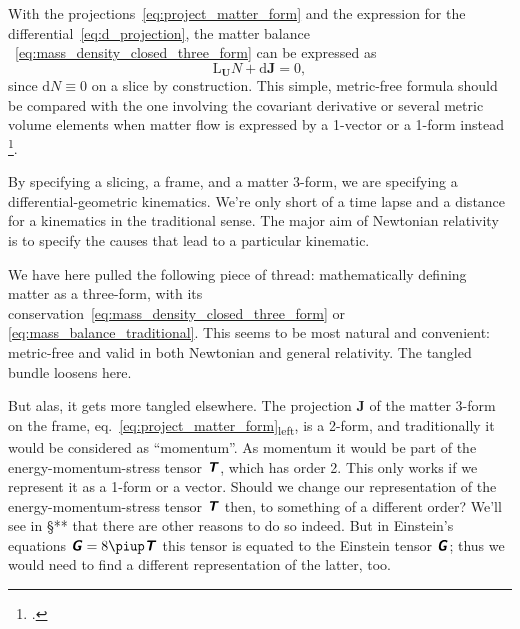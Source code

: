 \documentclass[\ifafour a4paper,12pt,\else a5paper,10pt,\fi%
onecolumn,oneside,article,%
british%
]{memoir}
\theoremstyle{remark}
\theoremstyle{innote}
\newcommand*{\mathte}[1]{\textbf{\textit{\textsf{#1}}}}
\newcommand*{\citep}{\footcites}
\newcommand*{\pu}{\piup}%
\newcommand*{\di}{\mathrm{d}}%
\renewcommand*{\|}[1][]{\nonscript\,#1\vert\nonscript\;\mathopen{}}
\newcommand*{\sect}{\S}%
\newcommand*{\eqn}{eq.}%
\newcommand*{\eg}{{e.g.}}
\newcommand*{\Li}{\mathrm{L}}
\newcommand*{\yd}{N}
\newcommand*{\yjj}{J}
\newcommand*{\yj}{\bm{\yjj}}
\newcommand*{\yGG}{G}
\newcommand*{\yG}{\mathte{\yGG}}
\newcommand*{\yTTf}{T}
\newcommand*{\yTf}{\mathte{\yTTf}}
\newcommand*{\yFF}{U}
\newcommand*{\yF}{\bm{\yFF}}
\begin{document}
With the projections~\eqref{eq:project_matter_form} and the expression for
the differential~\eqref{eq:d_projection}, the 
matter balance ~\eqref{eq:mass_density_closed_three_form} can be expressed as
\begin{equation}
  \label{eq:mass_balance_traditional}
  \Li_{\yF}\yd + \di\yj = 0,
\end{equation}
since $\di\yd\equiv 0$ on a slice by construction. This simple, metric-free
formula should be compared with the one involving the covariant derivative
or several metric volume elements when matter flow is expressed by a
1-vector or a 1-form instead \citep[\eg][\eqn~(7.205), \sect~7.3,
p.~361]{rezzollaetal2013}[\eqn~(6.47), \sect~6.3.2,
p.~110]{gourgoulhon2007_r2012}.

By specifying a slicing, a frame, and a matter 3-form, we are specifying a
differential-geometric kinematics. We're only short of a time lapse and a
distance for a kinematics in the traditional sense. The major aim of
Newtonian relativity is to specify the causes that lead to a particular
kinematic.

\medskip

We have here pulled the following piece of thread: mathematically defining
matter as a three-form, with its
conservation~\eqref{eq:mass_density_closed_three_form} or
\eqref{eq:mass_balance_traditional}. This seems to be most natural and
convenient: metric-free and valid in both Newtonian and general relativity.
The tangled bundle loosens here.

But alas, it gets more tangled elsewhere. The projection $\yj$ of the
matter 3-form on the frame,
\eqn~\eqref{eq:project_matter_form}\textsubscript{left}, is a 2-form, and
traditionally it would be considered as \enquote{momentum}. As momentum it
would be part of the energy-momentum-stress tensor $\yTf$, which has order
2. This only works if we represent it as a 1-form or a vector. Should we
change our representation of the energy-momentum-stress tensor $\yTf$ then,
to something of a different order? We'll see in \sect*** that there are
other reasons to do so indeed. But in Einstein's equations $\yG = 8\pu\yTf$
this tensor is equated to the Einstein tensor $\yG$; thus we would need to
find a different representation of the latter, too.
\end{document}
